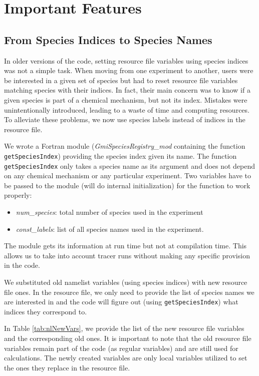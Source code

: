 \chapter[Important Features]{Important Features} \label{chap:features}

\section{From Species Indices to Species Names}
%
In older versions of the code,
setting resource file variables using species indices was not a simple task.
When moving from one experiment to another, users were be interested in
a given set of species but had to reset resource file variables matching
species with their indices.
In fact, their main concern was to know if a given species is part of
a chemical mechanism, but not its index.
Mistakes were unintentionally introduced, leading to a waste of time and
computing resources.
To alleviate these problems, we now use species labels instead
of indices in the resource file.

We wrote a Fortran module ({\em GmiSpeciesRegistry\_mod}
containing the function {\tt getSpeciesIndex}) providing the species index given
its name.
The function {\tt getSpeciesIndex} only takes a species name as its argument
and does not depend on any chemical mechanism or any particular experiment.
Two variables have to be passed to the module (will do internal initialization)
for the function to work properly:
%
\begin{itemize}
\item {\em num\_species}: total number of species used in the experiment
\item {\em const\_labels}: list of all species names used in the experiment.
\end{itemize}
%
\begin{remark}
The module gets its information at run time but not at compilation time.
This allows us to take into account tracer runs without making any specific
provision in the code.
\end{remark}

We substituted old namelist variables (using species indices) with
new resource file ones. In the resource file, we only need to provide the list of
species names we are interested in and the code will figure out
(using {\tt getSpeciesIndex}) what indices they correspond to.

In Table \ref{tab:nlNewVars}, we provide the list of the new resource file
variables and the corresponding old ones.
It is important to note that the old resource file variables remain part
of the code (as regular variables) and  are still used for calculations.
The newly created variables are only local variables utilized to
set the ones they replace in the resource file.

